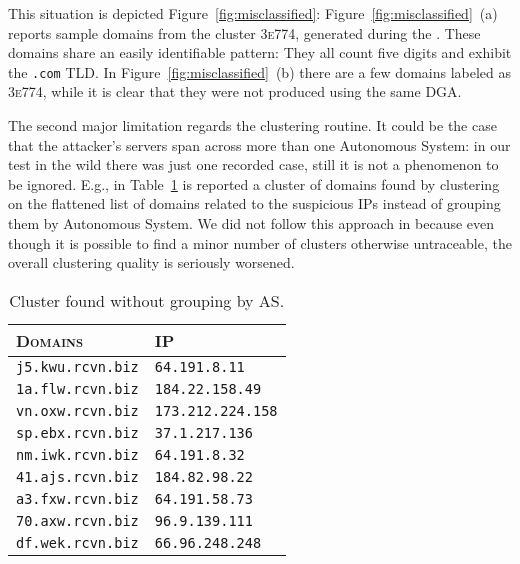 This situation is depicted Figure~\ref{fig:misclassified}: Figure~\ref{fig:misclassified}~(a) reports sample domains from the
cluster \textsc{3e774}, generated during the . These
domains share an easily identifiable pattern: They all count five digits and
exhibit the \texttt{.com} TLD. In Figure~\ref{fig:misclassified}~(b) there are
a few domains labeled as \textsc{3e774}, while it is clear that they were
not produced using the same DGA.

The second major limitation regards the clustering routine. It could be the case
that the attacker's servers span across more than one Autonomous System: in our test in the wild there was just one recorded case, still it is not a phenomenon to be ignored. E.g.,
in Table~\ref{tab:flat_domains} is reported a cluster of domains found by clustering
on the flattened list of domains related to the suspicious IPs instead of grouping
them by Autonomous System. We did not follow this approach in \thesystem because
even though it is possible to find a minor number of clusters otherwise untraceable,
the overall clustering quality is seriously worsened.

\begin{table}[!htp]
    \centering
    \begin{tabular}{ll}
        \toprule
        \textsc{Domains} & \textsc{IP} \\
        \midrule
        \texttt{j5.kwu.rcvn.biz} & \texttt{64.191.8.11} \\
        \texttt{1a.flw.rcvn.biz} & \texttt{184.22.158.49} \\
        \texttt{vn.oxw.rcvn.biz} & \texttt{173.212.224.158} \\
        \texttt{sp.ebx.rcvn.biz} & \texttt{37.1.217.136} \\
        \texttt{nm.iwk.rcvn.biz} & \texttt{64.191.8.32} \\
        \texttt{41.ajs.rcvn.biz} & \texttt{184.82.98.22} \\
        \texttt{a3.fxw.rcvn.biz} & \texttt{64.191.58.73} \\
        \texttt{70.axw.rcvn.biz} & \texttt{96.9.139.111} \\
        \texttt{df.wek.rcvn.biz} & \texttt{66.96.248.248} \\
        \bottomrule
    \end{tabular}
    \caption{Cluster found without grouping by AS.}
    \label{tab:flat_domains}
\end{table}


